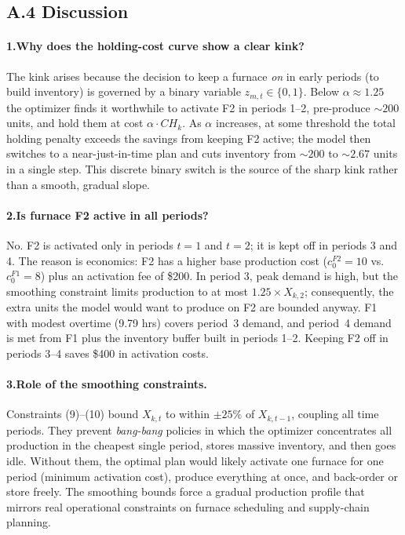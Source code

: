 \documentclass[11pt,a4paper]{article}
\begin{document}
\subsection{A.4\; Discussion}

\paragraph{1.\;Why does the holding-cost curve show a clear kink?}
The kink arises because the decision to keep a furnace \emph{on} in early
periods (to build inventory) is governed by a binary variable $z_{m,t}\in
\{0,1\}$.  Below $\alpha\approx 1.25$ the optimizer finds it worthwhile to
activate F2 in periods 1--2, pre-produce $\sim 200$ units, and hold them at
cost $\alpha\cdot CH_k$.  As $\alpha$ increases, at some threshold the total
holding penalty exceeds the savings from keeping F2 active; the model then
switches to a near-just-in-time plan and cuts inventory from $\sim 200$ to
$\sim 2.67$ units in a single step.  This discrete binary switch is the
source of the sharp kink rather than a smooth, gradual slope.

\paragraph{2.\;Is furnace F2 active in all periods?}
No.  F2 is activated only in periods $t=1$ and $t=2$; it is kept off in
periods 3 and 4.  The reason is economics: F2 has a higher base production
cost ($c_0^{F2}=10$ vs.\ $c_0^{F1}=8$) plus an activation fee of \$200.  In
period 3, peak demand is high, but the smoothing constraint limits production
to at most $1.25\times X_{k,2}$; consequently, the extra units the model
would want to produce on F2 are bounded anyway.  F1 with modest overtime
(9.79 hrs) covers period~3 demand, and period~4 demand is met from F1 plus
the inventory buffer built in periods 1--2.  Keeping F2 off in periods 3--4
saves \$400 in activation costs.

\paragraph{3.\;Role of the smoothing constraints.}
Constraints (9)--(10) bound $X_{k,t}$ to within $\pm 25\%$ of $X_{k,t-1}$,
coupling all time periods.  They prevent \emph{bang-bang} policies in which
the optimizer concentrates all production in the cheapest single period,
stores massive inventory, and then goes idle.  Without them, the optimal plan
would likely activate one furnace for one period (minimum activation cost),
produce everything at once, and back-order or store freely.  The smoothing
bounds force a gradual production profile that mirrors real operational
constraints on furnace scheduling and supply-chain planning.
\end{document}
